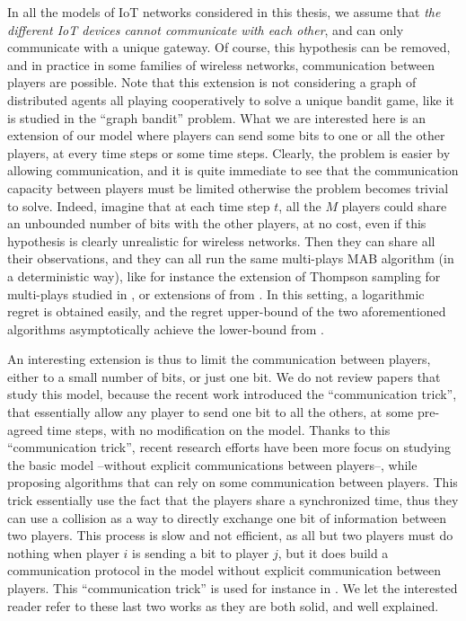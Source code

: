 In all the models of IoT networks considered in this thesis, we assume that \emph{the different IoT devices cannot communicate with each other}, and can only communicate with a unique gateway.
Of course, this hypothesis can be removed, and in practice in some families of wireless networks, communication between players are possible.
Note that this extension is not considering a graph of distributed agents all playing cooperatively to solve a unique bandit game, like it is studied in the ``graph bandit'' problem.
What we are interested here is an extension of our model where players can send some bits to one or all the other players, at every time steps or some time steps. Clearly, the problem is easier by allowing communication, and it is quite immediate to see that the communication capacity between players must be limited otherwise the problem becomes trivial to solve.
Indeed, imagine that at each time step $t$, all the $M$ players could share an unbounded number of bits with the other players, at no cost, even if this hypothesis is clearly unrealistic for wireless networks.
Then they can share all their observations, and they can all run the same multi-plays MAB algorithm \cite{Anantharam87a} (in a deterministic way), like for instance the extension of Thompson sampling for multi-plays studied in \cite{Komiyama15}, or extensions of \KLUCB{} from \cite{Luedtke16}.
In this setting, a logarithmic regret is obtained easily, and the regret upper-bound of the two aforementioned algorithms asymptotically achieve the lower-bound from \cite{Anantharam87a}.

An interesting extension is thus to limit the communication between players, either to a small number of bits, or just one bit.
We do not review papers that study this model, because the recent work \cite{BoursierPerchet18} introduced the ``communication trick'', that essentially allow any player to send one bit to all the others, at some pre-agreed time steps, with no modification on the model.
Thanks to this ``communication trick'', recent research efforts have been more focus on studying the basic model --without explicit communications between players--, while proposing algorithms that can rely on some communication between players.
This trick essentially use the fact that the players share a synchronized time, thus they can use a collision as a way to directly exchange one bit of information between two players.
This process is slow and not efficient, as all but two players must do nothing when player $i$ is sending a bit to player $j$, but it does build a communication protocol in the model without explicit communication between players.
This ``communication trick'' is used for instance in \cite{KaufmannAbbas19}.
We let the interested reader refer to these last two works \cite{BoursierPerchet18,KaufmannAbbas19} as they are both solid, and well explained.

